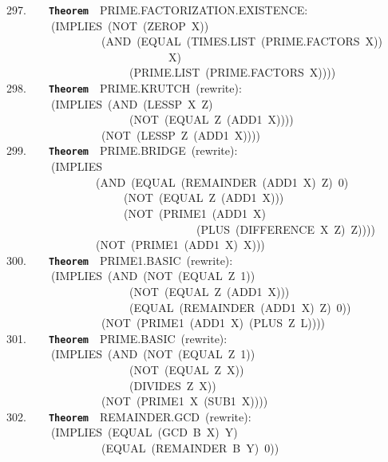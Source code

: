 \documentclass[11pt]{book}
\newenvironment{pubasis}{\begin{flushleft}\ttfamily\small}{\normalsize\rmfamily\end{flushleft}}
\newcommand{\axiomordefinition}[1]{\vspace{6pt}\texttt{\textbf{#1}}}
\begin{document}
\begin{pubasis}
297.~~~~\axiomordefinition{Theorem}~~PRIME.FAC\-TOR\-I\-ZA\-TION.EXISTENCE:\\
~~~~~~~~(IMPLIES~(NOT~(ZEROP~X))\\
~~~~~~~~~~~~~~~~~(AND~(EQUAL~(TIMES.LIST~(PRIME.FAC\-TORS~X))\\
~~~~~~~~~~~~~~~~~~~~~~~~~~~~~X)\\
~~~~~~~~~~~~~~~~~~~~~~(PRIME.LIST~(PRIME.FAC\-TORS~X))))\\

298.~~~~\axiomordefinition{Theorem}~~PRIME.KRUTCH~(rewrite):\\
~~~~~~~~(IMPLIES~(AND~(LESSP~X~Z)\\
~~~~~~~~~~~~~~~~~~~~~~(NOT~(EQUAL~Z~(ADD1~X))))\\
~~~~~~~~~~~~~~~~~(NOT~(LESSP~Z~(ADD1~X))))\\

299.~~~~\axiomordefinition{Theorem}~~PRIME.BRIDGE~(rewrite):\\
~~~~~~~~(IMPLIES\\
~~~~~~~~~~~~~~~~(AND~(EQUAL~(REMAINDER~(ADD1~X)~Z)~0)\\
~~~~~~~~~~~~~~~~~~~~~(NOT~(EQUAL~Z~(ADD1~X)))\\
~~~~~~~~~~~~~~~~~~~~~(NOT~(PRIME1~(ADD1~X)\\
~~~~~~~~~~~~~~~~~~~~~~~~~~~~~~~~~~(PLUS~(DIFFERENCE~X~Z)~Z))))\\
~~~~~~~~~~~~~~~~(NOT~(PRIME1~(ADD1~X)~X)))\\

300.~~~~\axiomordefinition{Theorem}~~PRIME1.BASIC~(rewrite):\\
~~~~~~~~(IMPLIES~(AND~(NOT~(EQUAL~Z~1))\\
~~~~~~~~~~~~~~~~~~~~~~(NOT~(EQUAL~Z~(ADD1~X)))\\
~~~~~~~~~~~~~~~~~~~~~~(EQUAL~(REMAINDER~(ADD1~X)~Z)~0))\\
~~~~~~~~~~~~~~~~~(NOT~(PRIME1~(ADD1~X)~(PLUS~Z~L))))\\

301.~~~~\axiomordefinition{Theorem}~~PRIME.BASIC~(rewrite):\\
~~~~~~~~(IMPLIES~(AND~(NOT~(EQUAL~Z~1))\\
~~~~~~~~~~~~~~~~~~~~~~(NOT~(EQUAL~Z~X))\\
~~~~~~~~~~~~~~~~~~~~~~(DIVIDES~Z~X))\\
~~~~~~~~~~~~~~~~~(NOT~(PRIME1~X~(SUB1~X))))\\

302.~~~~\axiomordefinition{Theorem}~~REMAINDER.GCD~(rewrite):\\
~~~~~~~~(IMPLIES~(EQUAL~(GCD~B~X)~Y)\\
~~~~~~~~~~~~~~~~~(EQUAL~(REMAINDER~B~Y)~0))\\


\end{pubasis}
\end{document}
